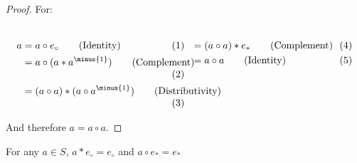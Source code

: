     \begin{proof}
        For:
        \par\vspace{-2.5ex}
        \begin{subequations}
            \begin{minipage}[t]{0.49\textwidth}
                \centering
                \begin{align}
                    a&=a\circ{e}_{\circ}
                    \tag{Identity}\\
                    &=a\circ(a*a^{\minus{1}})
                    \tag{Complement}\\
                    &=(a\circ{a})*(a\circ{a}^{\minus{1}})
                    \tag{Distributivity}
                \end{align}
            \end{minipage}
            \hfill
            \begin{minipage}[t]{0.49\textwidth}
                \centering
                \begin{align}
                    &=(a\circ{a})*{e}_{*}
                    \tag{Complement}\\
                    &=a\circ{a}\tag{Identity}
                \end{align}
            \end{minipage}
        \end{subequations}
        \par\vspace{2.5ex}
        And therefore $a=a\circ{a}$.
    \end{proof}
            \begin{theorem}
                For any $a\in S$, $a*e_{\circ}=e_{\circ}$
                and $a\circ e_{*}=e_{*}$
            \end{theorem}
